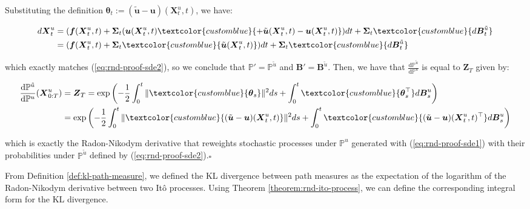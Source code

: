 \documentclass{article}
\newcommand{\bluetext}[1]{\textcolor{customblue}{#1}}
\begin{document}
Substituting the definition $\boldsymbol{\theta}_t:=(\tilde{\boldsymbol{u}}-\boldsymbol{u})(\boldsymbol{X}^u_t,t)$, we have:
\begin{small}
\begin{align}
    d\boldsymbol{X}^u_t&=(\boldsymbol{f}(\boldsymbol{X}^u_t,t)+\boldsymbol{\Sigma}_t(\boldsymbol{u}(\boldsymbol{X}^u_t,t)\bluetext{+\tilde{\boldsymbol{u}}(\boldsymbol{X}^u_t,t)-\boldsymbol{u}(\boldsymbol{X}^u_t,t)}) dt+\boldsymbol{\Sigma}_t \bluetext{d\boldsymbol{B}^{\tilde{u}}_t}\nonumber\\
    &=(\boldsymbol{f}(\boldsymbol{X}^u_t,t)+\boldsymbol{\Sigma}_t\bluetext{\tilde{\boldsymbol{u}}(\boldsymbol{X}^u_t,t)}) dt+\boldsymbol{\Sigma}_t \bluetext{d\boldsymbol{B}^{\tilde{u}}_t}
\end{align}
\end{small}
which exactly matches (\ref{eq:rnd-proof-sde2}), so we conclude that $\mathbb{P}' =\mathbb{P}^{\tilde{u}}$ and $\boldsymbol{B}' =\boldsymbol{B}^{\tilde{u}}$. Then, we have that $\frac{\mathrm{d}\mathbb{P}^{\tilde{u}}}{\mathrm{d}\mathbb{P}^u}$ is equal to $\boldsymbol{Z}_T$ given by:
\begin{small}
\begin{align}
    \frac{\mathrm{d}\mathbb{P}^{\tilde{u}}}{\mathrm{d}\mathbb{P}^u}(\boldsymbol{X}^u_{0:T})&=\boldsymbol{Z}_T=\exp\left(-\frac{1}{2}\int_0^t\|\bluetext{\boldsymbol{\theta}_s}\|^2ds+\int_0^t\bluetext{\boldsymbol{\theta}_s^\top} d\boldsymbol{B}^u_s\right)\nonumber\\
    &=\exp\left(-\frac{1}{2}\int_0^t\|\bluetext{(\tilde{\boldsymbol{u}}-\boldsymbol{u})(\boldsymbol{X}^u_t,t)}\|^2ds+\int_0^t\bluetext{(\tilde{\boldsymbol{u}}-\boldsymbol{u})(\boldsymbol{X}^u_t,t)^\top} d\boldsymbol{B}^u_s\right)
\end{align}
\end{small}
which is exactly the Radon-Nikodym derivative that reweights stochastic processes under $\mathbb{P}^u$ generated with (\ref{eq:rnd-proof-sde1}) with their probabilities under $\mathbb{P}^{\tilde{u}}$ defined by (\ref{eq:rnd-proof-sde2}).\hfill $\square$

From Definition \ref{def:kl-path-measure}, we defined the KL divergence between path measures as the expectation of the logarithm of the Radon-Nikodym derivative between two Itô processes. Using Theorem \ref{theorem:rnd-ito-process}, we can define the corresponding integral form for the KL divergence.
\end{document}
